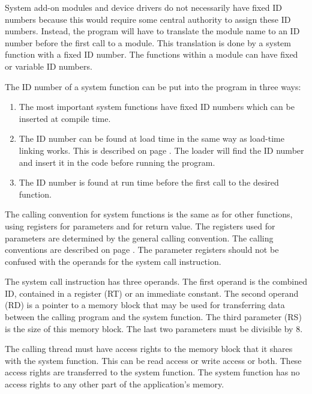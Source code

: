 \documentclass[forwardcom.tex]{subfiles}
\begin{document}
System add-on modules and device drivers do not necessarily have fixed ID numbers because this would require some central authority to assign these ID numbers. Instead, the program will have to translate the module name to an ID number before the first call to a module. This translation is done by a system function with a fixed ID number. The functions within a module can have fixed or variable ID numbers.
\vspace{2mm}

The ID number of a system function can be put into the program in three ways: 
\begin{enumerate}
\item The most important system functions have fixed ID numbers which can be inserted at compile time. 

\item The ID number can be found at load time in the same way as load-time linking works. This is described on page \pageref{loadTimeLinking}. 
The loader will find the ID number and insert it in the code before running the program. 

\item The ID number is found at run time before the first call to the desired function. 
\end{enumerate}

The calling convention for system functions is the same as for other functions, using registers for parameters and for return value. 
The registers used for parameters are determined by the general calling convention. 
The calling conventions are described on page \pageref{functionCallingConventions}.
The parameter registers should not be confused with the operands for the system call instruction. 
\vspace{2mm}

The system call instruction has three operands. The first operand is the combined ID, contained in a register (RT) or an immediate constant. The second operand (RD) is a pointer to a memory block that may be used for transferring data between the calling program and the system function. The third parameter (RS) is the size of this memory block. The last two parameters must be divisible by 8. 
\vspace{2mm}

The calling thread must have access rights to the memory block that it shares with the system 
function. This can be read access or write access or both. These access rights are transferred to the system function. The system function has no access rights to any other part of the application's memory.
\vspace{2mm}
\end{document}
